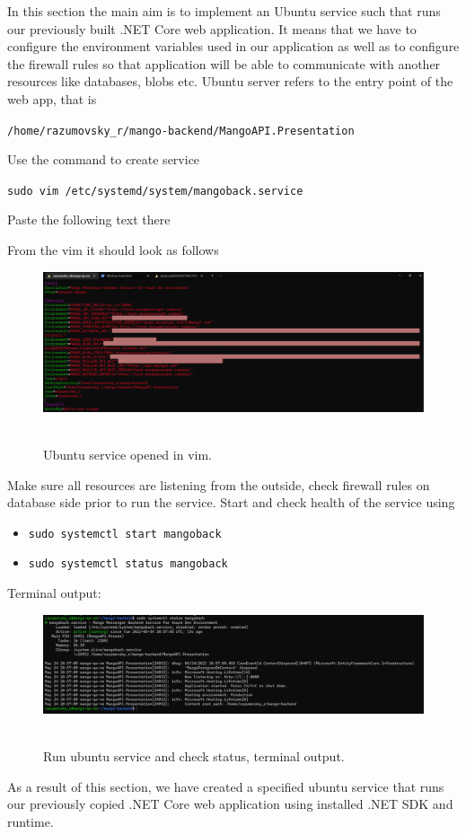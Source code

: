 In this section the main aim is to implement an Ubuntu service such that runs our previously built
.NET Core web application.
It means that we have to configure the environment variables used in our application
as well as to configure the firewall rules so that application will be able to communicate with
another resources like databases, blobs etc.
Ubuntu server refers to the entry point of the web app, that is
\begin{center}
    \texttt{/home/razumovsky\_r/mango-backend/MangoAPI.Presentation}
\end{center}
Use the command to create service
\begin{center}
    \texttt{sudo vim /etc/systemd/system/mangoback.service}
\end{center}
Paste the following text there

From the vim it should look as follows~\cite{Ubuntu_service}
\begin{figure}[H]
    \centering
    \includegraphics[width=1\textwidth]{img/05_ubuntu_service_vim}
    ~\caption{Ubuntu service opened in vim.}\label{fig:figure13}
\end{figure}
Make sure all resources are listening from the outside, check firewall rules on database side prior to run the service.
Start and check health of the service using
\begin{itemize}
    \item \texttt{sudo systemctl start mangoback}
    \item \texttt{sudo systemctl status mangoback}
\end{itemize}
Terminal output:
\begin{figure}[H]
    \centering
    \includegraphics[width=1\textwidth]{img/05_ubuntu_service_status}
    ~\caption{Run ubuntu service and check status, terminal output.}\label{fig:figure14}
\end{figure}
As a result of this section, we have created a specified ubuntu service that runs our previously copied .NET Core
web application using installed .NET SDK and runtime.